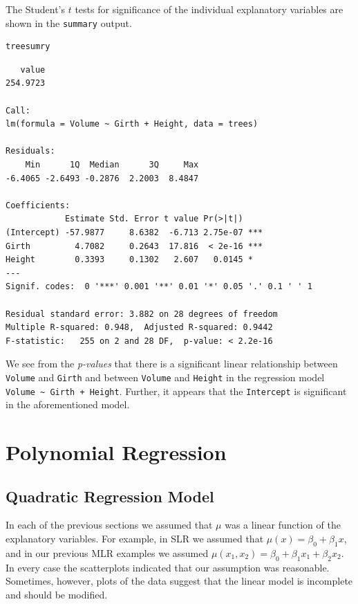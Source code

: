 \documentclass[captions=tableheading]{scrbook}
\begin{document}
The Student's \(t\) tests for significance of the individual explanatory variables are shown in the \texttt{summary} output.


\begin{verbatim}
treesumry
\end{verbatim}


\begin{verbatim}
   value 
254.9723
 
Call:
lm(formula = Volume ~ Girth + Height, data = trees)

Residuals:
    Min      1Q  Median      3Q     Max 
-6.4065 -2.6493 -0.2876  2.2003  8.4847 

Coefficients:
            Estimate Std. Error t value Pr(>|t|)    
(Intercept) -57.9877     8.6382  -6.713 2.75e-07 ***
Girth         4.7082     0.2643  17.816  < 2e-16 ***
Height        0.3393     0.1302   2.607   0.0145 *  
---
Signif. codes:  0 '***' 0.001 '**' 0.01 '*' 0.05 '.' 0.1 ' ' 1 

Residual standard error: 3.882 on 28 degrees of freedom
Multiple R-squared: 0.948,	Adjusted R-squared: 0.9442 
F-statistic:   255 on 2 and 28 DF,  p-value: < 2.2e-16
\end{verbatim}

We see from the \emph{p-values} that there is a significant linear relationship between \texttt{Volume} and \texttt{Girth} and between \texttt{Volume} and \texttt{Height} in the regression model \texttt{Volume \textasciitilde{} Girth + Height}. Further, it appears that the \texttt{Intercept} is significant in the aforementioned model.
\section{Polynomial Regression}
\label{sec-7-4}

\label{sec:Polynomial-Regression}
\subsection{Quadratic Regression Model}
\label{sec-7-4-1}


In each of the previous sections we assumed that \(\mu\) was a linear function of the explanatory variables. For example, in SLR we assumed that \(\mu(x)=\beta_{0}+\beta_{1}x\), and in our previous MLR examples we assumed \(\mu(x_{1},x_{2})=\beta_{0}+\beta_{1}x_{1}+\beta_{2}x_{2}\). In every case the scatterplots indicated that our assumption was reasonable. Sometimes, however, plots of the data suggest that the linear model is incomplete and should be modified.
\end{document}

